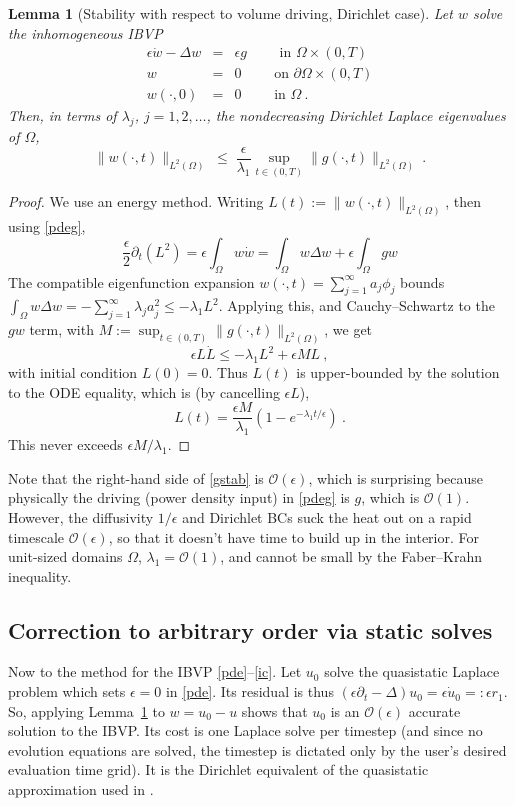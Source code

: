 \documentclass[10pt]{article}
\newcommand{\be}{\begin{equation}}
\newcommand{\ee}{\end{equation}}
\newcommand{\bea}{\begin{eqnarray}}
\newcommand{\eea}{\end{eqnarray}}
\newcommand{\bigO}{{\mathcal O}}
\newtheorem{lem}[thm]{Lemma}
\newcommand{\pO}{{\partial\Omega}}
\newcommand{\eps}{\epsilon}
\newcommand{\dt}{\partial_t}
\newcommand{\LTO}{{L^2(\Omega)}}
\begin{document}
\begin{lem}[Stability with respect to volume driving, Dirichlet case]  %
  Let $w$ solve the inhomogeneous IBVP
\bea
\eps\dot{w} - \Delta w &=& \eps g    \qquad \mbox{ in } \Omega\times (0,T)
\label{pdeg}
\\
w  &=& 0  \qquad \mbox{ on } \pO \times (0,T)
\label{bc0}
\\
w(\cdot, 0)    &=&  0 \qquad \mbox{ in } \Omega ~.
\eea
Then, in terms of $\lambda_j$, $j=1,2,\dots$,
the nondecreasing Dirichlet Laplace eigenvalues of $\Omega$,
\be
\|w(\cdot,t)\|_\LTO \;\le\;
\frac{\eps}{\lambda_1}\sup_{t\in(0,T)}\|g(\cdot,t)\|_\LTO~.
\label{gstab}
\ee
\label{l:gstab}
\end{lem}
\begin{proof}
We use an energy method.
Writing $L(t):=\|w(\cdot,t)\|_\LTO$, then using \eqref{pdeg},
\be
\frac{\eps}{2}\dt(L^2) = \eps\int_\Omega w \dot w = \int_\Omega
w\Delta w + \eps \int_\Omega g w
\label{energy}
\ee
The compatible eigenfunction expansion
$w(\cdot,t) = \sum_{j=1}^\infty a_j \phi_j$
bounds $\int_\Omega w\Delta w = -\sum_{j=1}^\infty \lambda_j a_j^2
\le -\lambda_1 L^2$.
Applying this, and Cauchy--Schwartz to the $gw$ term, with $M:=\sup_{t\in(0,T)}\|g(\cdot,t)\|_\LTO$,
we get
$$
\eps L\dot L \le -\lambda_1 L^2 + \eps ML~,
$$
with initial condition $L(0)=0$.
Thus $L(t)$ is upper-bounded by the solution to the ODE equality,
which is (by cancelling $\eps L$),
$$
L(t) = \frac{\eps M}{\lambda_1} (1 - e^{-\lambda_1 t / \eps})~.
$$
This never exceeds $\eps M/\lambda_1$.
\end{proof}

Note that the right-hand side of \eqref{gstab} is $\bigO(\eps)$,
which is surprising because physically the driving
(power density input) in \eqref{pdeg} is $g$, which is $\bigO(1)$.
However, the diffusivity $1/\eps$ and Dirichlet BCs suck
the heat out on a rapid timescale $\bigO(\eps)$, so that it doesn't have time to build up in the interior.
For unit-sized domains $\Omega$, $\lambda_1=\bigO(1)$, and cannot be
small by the Faber--Krahn inequality.


\subsection{Correction to arbitrary order via static solves}

Now to the method for the IBVP \eqref{pde}--\eqref{ic}.
Let $u_0$ solve the quasistatic Laplace problem which sets $\eps=0$
in \eqref{pde}.
Its residual is thus $(\eps\dt-\Delta)u_0 = \eps \dot u_0 =: \eps r_1$.
So, applying Lemma~\ref{l:gstab} to $w= u_0-u$
shows that $u_0$ is an $\bigO(\eps)$ accurate solution
to the IBVP.
Its cost is one Laplace solve per timestep (and since no evolution
equations are solved, the timestep is dictated only by the user's desired
evaluation time grid).
It is the Dirichlet equivalent of the quasistatic approximation
used in \cite{diegmiller18}.
\end{document}
